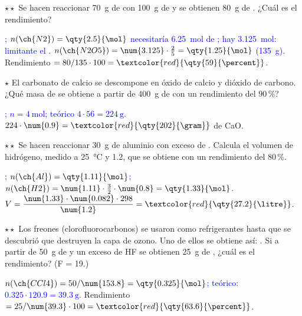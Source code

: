 \begin{exercise}
    \(\star\star\) Se hacen reaccionar \qty{70}{\gram} de  con \qty{100}{\gram} de  y se obtienen \qty{80}{\gram} de
    . ¿Cuál es el rendimiento?
    \begin{solu}
        \textcolor{blue}{; \(n(\ch{N2}) = \qty{2.5}{\mol}\) necesitaría \qty{6.25}{\mol} de ; hay
        \qty{3.125}{\mol}: limitante el . \(n(\ch{N2O5}) = \num{3.125} \cdot \frac{2}{5} = \qty{1.25}{\mol}\) (\qty{135}{\gram}).}
        Rendimiento \(= 80/135 \cdot 100 = \textcolor{red}{\qty{59}{\percent}}\).
    \end{solu}
\end{exercise}

\begin{exercise}
    \(\star\) El carbonato de calcio se descompone en óxido de calcio y dióxido de carbono. ¿Qué masa de  se obtiene a partir
    de \qty{400}{\gram} de  con un rendimiento del 90\,\%?
    \begin{solu}
        \textcolor{blue}{; \(n = \qty{4}{\mol}\); teórico \(4 \cdot 56 = \qty{224}{\gram}\).}
        \(224 \cdot \num{0.9} = \textcolor{red}{\qty{202}{\gram}}\) de CaO.
    \end{solu}
\end{exercise}

\begin{exercise}
    \(\star\star\) Se hacen reaccionar \qty{30}{\gram} de aluminio con exceso de . Calcula el volumen de hidrógeno, medido
    a \qty{25}{\degreeCelsius} y \qty{1.2}{\atm}, que se obtiene con un rendimiento del 80\,\%.
    \begin{solu}
        \textcolor{blue}{; \(n(\ch{Al}) = \qty{1.11}{\mol}\); \(n(\ch{H2}) = \num{1.11} \cdot \frac{3}{2}
        \cdot \num{0.8} = \qty{1.33}{\mol}\).} \(V = \dfrac{\num{1.33} \cdot \num{0.082} \cdot 298}{\num{1.2}} = \textcolor{red}{\qty{27.2}{\litre}}\).
    \end{solu}
\end{exercise}

\begin{exercise}
    \(\star\star\) Los freones (clorofluorocarbonos) se usaron como refrigerantes hasta que se descubrió que destruyen la capa de
    ozono. Uno de ellos se obtiene así: . Si a partir de \qty{50}{\gram} de  y un
    exceso de HF se obtienen \qty{25}{\gram} de , ¿cuál es el rendimiento? (F = 19.)
    \begin{solu}
        \textcolor{blue}{\(n(\ch{CCl4}) = 50/\num{153.8} = \qty{0.325}{\mol}\); teórico: \(\num{0.325} \cdot \num{120.9} = \qty{39.3}{\gram}\).}
        Rendimiento \(= 25/\num{39.3} \cdot 100 = \textcolor{red}{\qty{63.6}{\percent}}\).
    \end{solu}
\end{exercise}


